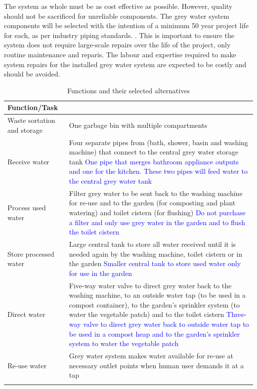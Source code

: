 \documentclass[a4paper,11pt,fleqn]{report}
\begin{document}
The system as whole must be as cost effective as possible. However, quality should not be sacrificed for unreliable components. The grey water system components will be selected with the intention of a minimum 50 year project life for each, as per industry piping standards. \citep{Fischer2012}. This is important to ensure the system does not require large-scale repairs over the life of the project, only routine maintenance and reparis. The labour and expertise required to make system repairs for the installed grey water system are expected to be costly and should be avoided.
%
\begin{table}[h!]
\caption {Functions and their selected alternatives} \label{tb: chosen_Alts} 
\begin{center}
\begin{tabular}{p{3.5cm}|p{9cm}}\toprule
	{\textbf{Function/Task}} & {\textbf{Selected Alternative}\\ \midrule
    Waste sortation and storage & One garbage bin with multiple compartments \\
     \hline
     Receive water & Four separate pipes from (bath, shower, basin and washing machine) that connect to the central grey water storage tank \textcolor{blue}{One pipe that merges bathroom appliance outputs and one for the kitchen. These two pipes will feed water to the central grey water tank}\\
    \hline
    Process used water & Filter grey water to be sent back to the washing machine for re-use and to the garden (for composting and plant watering) and toilet cistern (for flushing) \textcolor{blue}{Do not purchase a filter and only use grey water in the garden and to flush the toilet cistern}\\
    \hline
    Store processed water & Large central tank to store all water received until it is needed again by the washing machine, toilet cistern or in the garden \textcolor{blue}{Smaller central tank to store used water only for use in the garden}\\
    \hline
    Direct water & Five-way water valve to direct grey water back to the washing machine, to an outside water tap (to be used in a compost container), to the garden's sprinkler system (to water the vegetable patch) and to the toilet cistern \textcolor{blue}{Three-way valve to direct grey water back to outside water tap to be used in a compost heap and to the garden's sprinkler system to water the vegetable patch}\\
    \hline
    Re-use water & Grey water system makes water available for re-use at necessary outlet points when human user demands it at a tap\\
}
\end{tabular}
\end{center}
\end{table}
\end{document}
